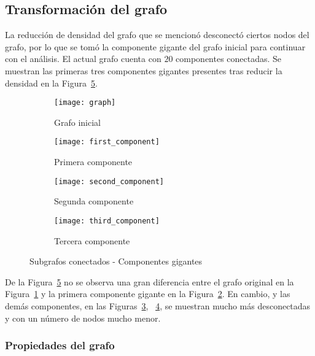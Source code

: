 \documentclass{article}
\begin{document}
\subsection{Transformación del grafo}\label{subsec:transformacion-del-grafo}

La reducción de densidad del grafo que se mencionó desconectó ciertos nodos del grafo, por lo que se tomó la componente gigante del grafo inicial para continuar con el análisis.
El actual grafo cuenta con $20$ componentes conectadas.
Se muestran las primeras tres componentes gigantes presentes tras reducir la densidad en la Figura~\ref{fig:connected_components}.


\begin{figure}[h!]
  \centering
  \begin{subfigure}[H]{0.2\textwidth}
      \centering
      \texttt{[image: graph]}
      \caption{Grafo inicial}
      \label{fig:grafo}
  \end{subfigure}
  \centering
  \begin{subfigure}[H]{0.2\textwidth}
      \centering
      \texttt{[image: first\_component]}
      \caption{Primera componente}
      \label{fig:first_component}
  \end{subfigure}
    \begin{subfigure}[H]{0.2\textwidth}
      \centering
      \texttt{[image: second\_component]}
      \caption{Segunda componente}
      \label{fig:second_component}
  \end{subfigure}
  \begin{subfigure}[H]{0.2\textwidth}
      \centering
      \texttt{[image: third\_component]}
      \caption{Tercera componente}
    \label{fig:third_component}
  \end{subfigure}
    \caption{Subgrafos conectados - Componentes gigantes}
    \label{fig:connected_components}
\end{figure}

De la Figura~\ref{fig:connected_components} no se observa una gran diferencia entre el grafo original en la Figura~\ref{fig:grafo} y la primera componente gigante en la Figura~\ref{fig:first_component}.
En cambio, y las demás componentes, en las Figuras~\ref{fig:second_component}, ~\ref{fig:third_component}, se muestran mucho más desconectadas y con un número de nodos mucho menor.

\subsubsection{Propiedades del grafo}\label{subsubsec:metricas-del-grafo}
\end{document}
